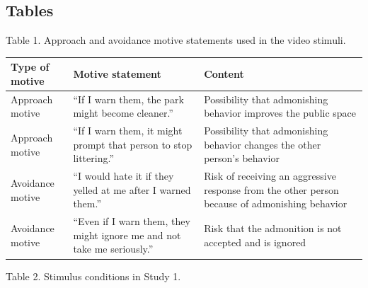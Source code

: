 \subsection{Tables}\label{tables}

Table 1. Approach and avoidance motive statements used in the video
stimuli.

{\def\LTcaptype{none} %
\begin{longtable}[]{@{}
  >{\raggedright\arraybackslash}p{}
  >{\raggedright\arraybackslash}p{}
  >{\raggedright\arraybackslash}p{}@{}}
\toprule\noalign{}
\begin{minipage}[b]{\linewidth}\raggedright
Type of motive
\end{minipage} & \begin{minipage}[b]{\linewidth}\raggedright
Motive statement
\end{minipage} & \begin{minipage}[b]{\linewidth}\raggedright
Content
\end{minipage} \\
\midrule\noalign{}
\endhead
\bottomrule\noalign{}
\endlastfoot
Approach motive & ``If I warn them, the park might become cleaner.'' &
Possibility that admonishing behavior improves the public space \\
Approach motive & ``If I warn them, it might prompt that person to stop
littering.'' & Possibility that admonishing behavior changes the other
person's behavior \\
Avoidance motive & ``I would hate it if they yelled at me after I warned
them.'' & Risk of receiving an aggressive response from the other person
because of admonishing behavior \\
Avoidance motive & ``Even if I warn them, they might ignore me and not
take me seriously.'' & Risk that the admonition is not accepted and is
ignored \\
\end{longtable}
}

Table 2. Stimulus conditions in Study 1.

